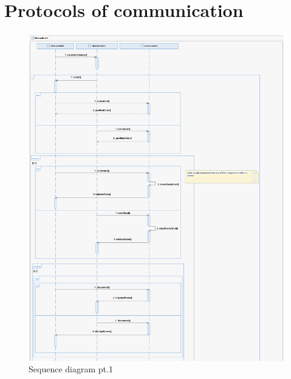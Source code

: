 \documentclass[a4paper, 10pt, oneside]{article}
\begin{document}
\section{Protocols of communication}
	\begin{figure}[h]
		\centering
		\includegraphics[scale=0.35]{img/sequence1.png}
		\caption{Sequence diagram pt.1}
		\label{fig:Sequence1}
	\end{figure}
	\newpage
\end{document}
